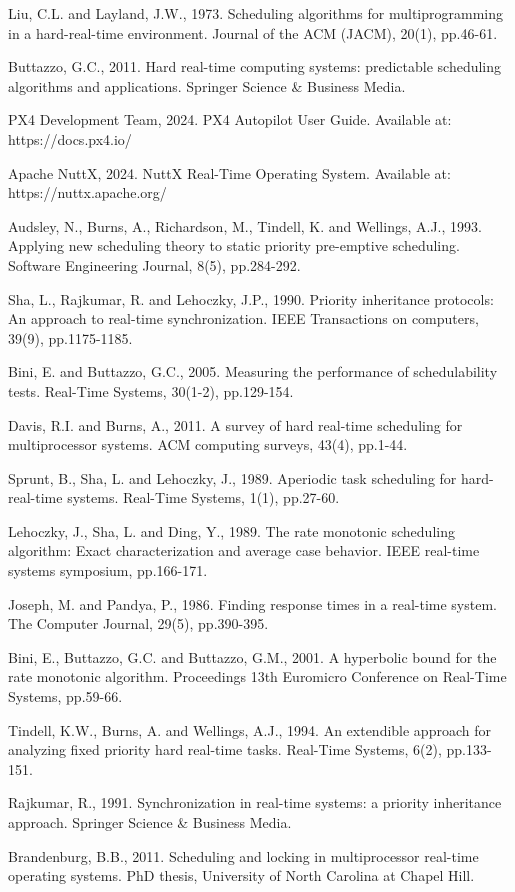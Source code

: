 \documentclass[12pt,a4paper]{article}
\begin{document}
\begin{thebibliography}{15}
Liu, C.L. and Layland, J.W., 1973. Scheduling algorithms for multiprogramming in a hard-real-time environment. Journal of the ACM (JACM), 20(1), pp.46-61.

Buttazzo, G.C., 2011. Hard real-time computing systems: predictable scheduling algorithms and applications. Springer Science \& Business Media.

PX4 Development Team, 2024. PX4 Autopilot User Guide. Available at: https://docs.px4.io/

Apache NuttX, 2024. NuttX Real-Time Operating System. Available at: https://nuttx.apache.org/

Audsley, N., Burns, A., Richardson, M., Tindell, K. and Wellings, A.J., 1993. Applying new scheduling theory to static priority pre-emptive scheduling. Software Engineering Journal, 8(5), pp.284-292.

Sha, L., Rajkumar, R. and Lehoczky, J.P., 1990. Priority inheritance protocols: An approach to real-time synchronization. IEEE Transactions on computers, 39(9), pp.1175-1185.

Bini, E. and Buttazzo, G.C., 2005. Measuring the performance of schedulability tests. Real-Time Systems, 30(1-2), pp.129-154.

Davis, R.I. and Burns, A., 2011. A survey of hard real-time scheduling for multiprocessor systems. ACM computing surveys, 43(4), pp.1-44.

Sprunt, B., Sha, L. and Lehoczky, J., 1989. Aperiodic task scheduling for hard-real-time systems. Real-Time Systems, 1(1), pp.27-60.

Lehoczky, J., Sha, L. and Ding, Y., 1989. The rate monotonic scheduling algorithm: Exact characterization and average case behavior. IEEE real-time systems symposium, pp.166-171.

Joseph, M. and Pandya, P., 1986. Finding response times in a real-time system. The Computer Journal, 29(5), pp.390-395.

Bini, E., Buttazzo, G.C. and Buttazzo, G.M., 2001. A hyperbolic bound for the rate monotonic algorithm. Proceedings 13th Euromicro Conference on Real-Time Systems, pp.59-66.

Tindell, K.W., Burns, A. and Wellings, A.J., 1994. An extendible approach for analyzing fixed priority hard real-time tasks. Real-Time Systems, 6(2), pp.133-151.

Rajkumar, R., 1991. Synchronization in real-time systems: a priority inheritance approach. Springer Science \& Business Media.

Brandenburg, B.B., 2011. Scheduling and locking in multiprocessor real-time operating systems. PhD thesis, University of North Carolina at Chapel Hill.
\end{thebibliography}
\end{document}
